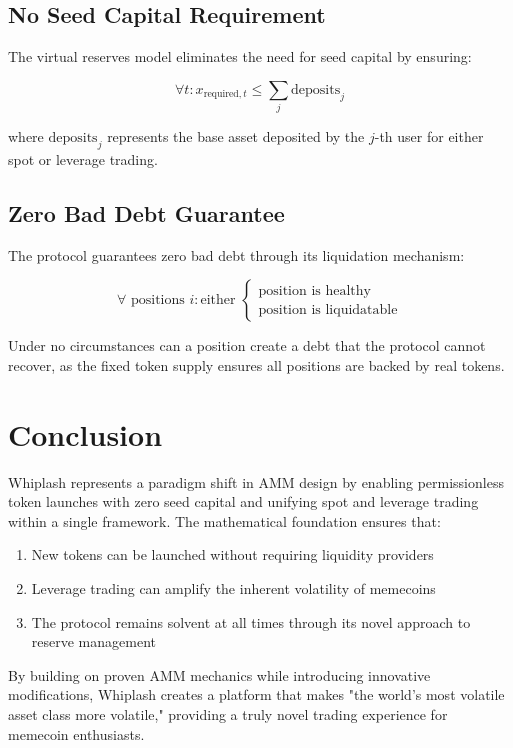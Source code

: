 \documentclass[11pt]{article}
\begin{document}
\subsection{No Seed Capital Requirement}

The virtual reserves model eliminates the need for seed capital by ensuring:

\begin{equation}
\forall t: x_{\text{required},t} \leq \sum_{j} \text{deposits}_j
\end{equation}

where $\text{deposits}_j$ represents the base asset deposited by the $j$-th user for either spot or leverage trading.

\subsection{Zero Bad Debt Guarantee}

The protocol guarantees zero bad debt through its liquidation mechanism:

\begin{equation}
\forall \text{ positions } i: \text{either } \begin{cases}
\text{position is healthy} \\
\text{position is liquidatable}
\end{cases}
\end{equation}

Under no circumstances can a position create a debt that the protocol cannot recover, as the fixed token supply ensures all positions are backed by real tokens.

\section{Conclusion}

Whiplash represents a paradigm shift in AMM design by enabling permissionless token launches with zero seed capital and unifying spot and leverage trading within a single framework. The mathematical foundation ensures that:

\begin{enumerate}
    \item New tokens can be launched without requiring liquidity providers
    \item Leverage trading can amplify the inherent volatility of memecoins
    \item The protocol remains solvent at all times through its novel approach to reserve management
\end{enumerate}

By building on proven AMM mechanics while introducing innovative modifications, Whiplash creates a platform that makes "the world's most volatile asset class more volatile," providing a truly novel trading experience for memecoin enthusiasts.
\end{document}
